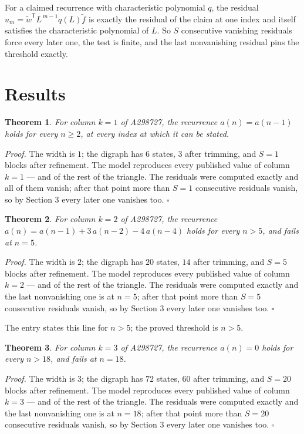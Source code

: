 \documentclass[11pt]{article}
\newtheorem{theorem}{Theorem}
\theoremstyle{definition}
\begin{document}
For a claimed recurrence with characteristic polynomial $q$, the residual $u_m = \tilde w^{\mathsf T}L^{\,m-1}q(L)\tilde f$ is exactly the residual of the claim at one index and itself satisfies the characteristic polynomial of $L$. So $S$ consecutive vanishing residuals force every later one, the test is finite, and the last nonvanishing residual pins the threshold exactly.

\section{Results}

\begin{theorem} For column $k = 1$ of A298727, the recurrence $a(n) = a(n-1)$ holds for every $n \ge 2$, at every index at which it can be stated.\end{theorem}

{\itshape Proof.} The width is $1$; the digraph has $6$ states, $3$ after trimming, and $S = 1$ blocks after refinement. The model reproduces every published value of column $k = 1$ --- and of the rest of the triangle. The residuals were computed exactly and all of them vanish; after that point more than $S = 1$ consecutive residuals vanish, so by Section 3 every later one vanishes too. $\square$

\begin{theorem} For column $k = 2$ of A298727, the recurrence $a(n) = a(n-1) + 3\,a(n-2) - 4\,a(n-4)$ holds for every $n > 5$, and fails at $n = 5$.\end{theorem}

{\itshape Proof.} The width is $2$; the digraph has $20$ states, $14$ after trimming, and $S = 5$ blocks after refinement. The model reproduces every published value of column $k = 2$ --- and of the rest of the triangle. The residuals were computed exactly and the last nonvanishing one is at $n = 5$; after that point more than $S = 5$ consecutive residuals vanish, so by Section 3 every later one vanishes too. $\square$

The entry states this line for $n > 5$; the proved threshold is $n > 5$.

\begin{theorem} For column $k = 3$ of A298727, the recurrence $a(n) = 0$ holds for every $n > 18$, and fails at $n = 18$.\end{theorem}

{\itshape Proof.} The width is $3$; the digraph has $72$ states, $60$ after trimming, and $S = 20$ blocks after refinement. The model reproduces every published value of column $k = 3$ --- and of the rest of the triangle. The residuals were computed exactly and the last nonvanishing one is at $n = 18$; after that point more than $S = 20$ consecutive residuals vanish, so by Section 3 every later one vanishes too. $\square$
\end{document}
